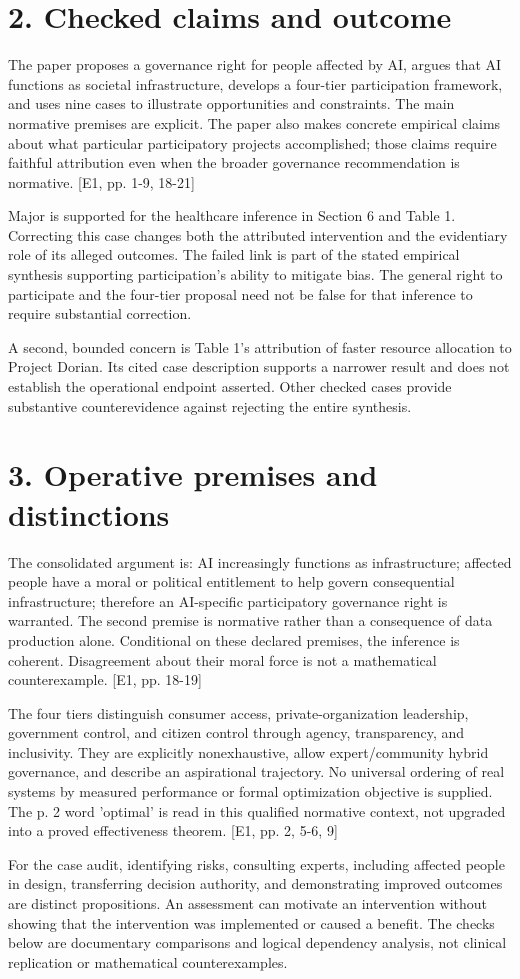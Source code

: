 \documentclass[10pt]{article}
\begin{document}
\section*{2. Checked claims and outcome}
The paper proposes a governance right for people affected by AI, argues that AI functions as societal infrastructure, develops a four-tier participation framework, and uses nine cases to illustrate opportunities and constraints. The main normative premises are explicit. The paper also makes concrete empirical claims about what particular participatory projects accomplished; those claims require faithful attribution even when the broader governance recommendation is normative. [E1, pp. 1-9, 18-21]\par
Major is supported for the healthcare inference in Section 6 and Table 1. Correcting this case changes both the attributed intervention and the evidentiary role of its alleged outcomes. The failed link is part of the stated empirical synthesis supporting participation’s ability to mitigate bias. The general right to participate and the four-tier proposal need not be false for that inference to require substantial correction.\par
A second, bounded concern is Table 1’s attribution of faster resource allocation to Project Dorian. Its cited case description supports a narrower result and does not establish the operational endpoint asserted. Other checked cases provide substantive counterevidence against rejecting the entire synthesis.\par
\section*{3. Operative premises and distinctions}
The consolidated argument is: AI increasingly functions as infrastructure; affected people have a moral or political entitlement to help govern consequential infrastructure; therefore an AI-specific participatory governance right is warranted. The second premise is normative rather than a consequence of data production alone. Conditional on these declared premises, the inference is coherent. Disagreement about their moral force is not a mathematical counterexample. [E1, pp. 18-19]\par
The four tiers distinguish consumer access, private-organization leadership, government control, and citizen control through agency, transparency, and inclusivity. They are explicitly nonexhaustive, allow expert/community hybrid governance, and describe an aspirational trajectory. No universal ordering of real systems by measured performance or formal optimization objective is supplied. The p. 2 word ’optimal’ is read in this qualified normative context, not upgraded into a proved effectiveness theorem. [E1, pp. 2, 5-6, 9]\par
For the case audit, identifying risks, consulting experts, including affected people in design, transferring decision authority, and demonstrating improved outcomes are distinct propositions. An assessment can motivate an intervention without showing that the intervention was implemented or caused a benefit. The checks below are documentary comparisons and logical dependency analysis, not clinical replication or mathematical counterexamples.\par
\end{document}
